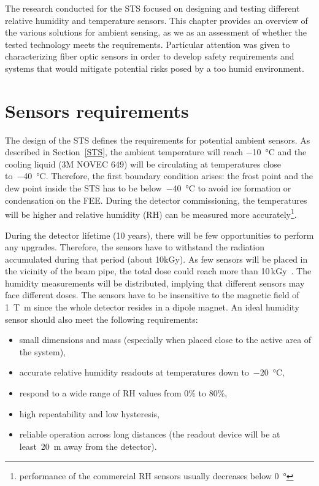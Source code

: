 The research conducted for the \gls{STS} focused on designing and testing different relative humidity and temperature sensors. This chapter provides an overview of the various solutions for ambient sensing, as we as an assessment of whether the tested technology meets the requirements. Particular attention was given to characterizing fiber optic sensors in order to develop safety requirements and systems that would mitigate potential risks posed by a too humid environment. 


\section{Sensors requirements}

The design of the \gls{STS} \cite{Heuser:54798} defines the requirements for potential ambient sensors. As described in Section~\ref{STS}, the ambient temperature will reach \SI{-10}{\celsius} and the cooling liquid (3M NOVEC 649) will be circulating at temperatures close to~\SI{-40}{\celsius}. Therefore, the first boundary condition arises: the frost point and the dew point inside the \gls{STS} has to be below~\SI{-40}{\celsius} to avoid ice formation or condensation on the \gls{FEE}.
During the detector commissioning, the temperatures will be higher and relative humidity (\gls{RH}) can be measured more accurately\footnote{performance of the commercial RH sensors usually decreases below \SI{0}{\degree}}. 

During the detector lifetime (10 years), there will be few opportunities to perform any upgrades. Therefore, the sensors have to withstand the radiation accumulated during that period (about 10kGy). As few sensors will be placed in the vicinity of the beam pipe, the total dose could reach more than 10\,kGy~\cite{Heuser:54798}. The humidity measurements will be distributed, implying that different sensors may face different doses. 
The sensors have to be insensitive to the magnetic field of \SI{1}{\tesla\metre} since the whole detector resides in a dipole magnet.  An ideal humidity sensor should also meet the following requirements:
\begin{itemize}
    \item small dimensions and mass (especially when placed close to the active area of the system),
    \item accurate relative humidity readouts at temperatures down to~\SI{-20}{\celsius}, 
    \item respond to a wide range of \gls{RH} values from 0\% to 80\%,
    \item high repeatability and low hysteresis,
    \item reliable operation across long distances (the readout device will be at least~\SI{20}{\metre} away from the detector).
\end{itemize}


